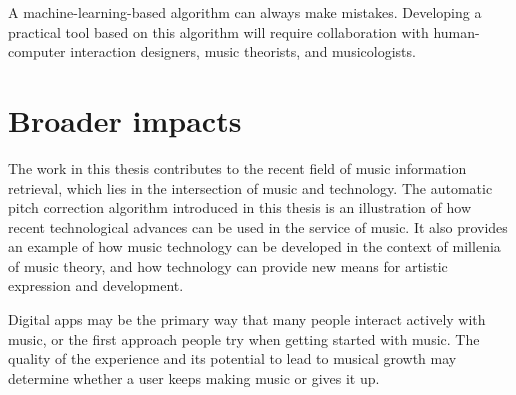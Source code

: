 A machine-learning-based algorithm can always make mistakes. Developing a practical tool based on this algorithm will require collaboration with human-computer interaction designers, music theorists, and musicologists.

\section{Broader impacts}
The work in this thesis contributes to the recent field of music information retrieval, which lies in the intersection of music and technology. The automatic pitch correction algorithm introduced in this thesis is an illustration of how recent technological advances can be used in the service of music. It also provides an example of how music technology can be developed in the context of millenia of music theory, and how technology can provide new means for artistic expression and development.

Digital apps may be the primary way that many people interact actively with music, or the first approach people try when getting started with music. The quality of the experience and its potential to lead to musical growth may determine whether a user keeps making music or gives it up.

